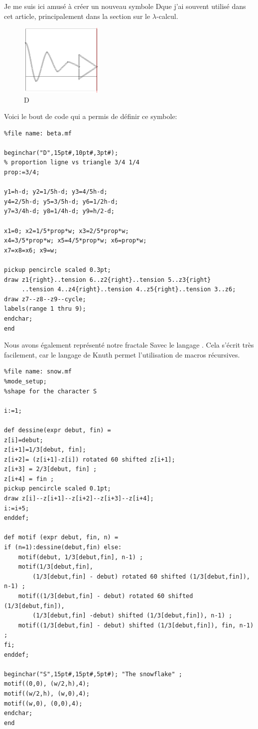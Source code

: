 \documentclass[11pt]{book}
\newcommand{\imp}{{\letterimp D}\hspace{0.1cm}}
\newcommand{\snow}{{\lettersnow S\hspace{0.2cm}}}
\begin{document}
Je me suis ici amusé à créer un nouveau symbole  \imp que j'ai souvent
utilisé dans cet article, principalement dans la section sur le $\lambda$-calcul. 

\begin{figure}[H]
	\centering
	\caption{\imp}
	\includegraphics[width=4.0cm]{imp.png}
\end{figure}
Voici le bout de code qui a permis de définir ce symbole:
\begin{Verbatim}
%file name: beta.mf

beginchar("D",15pt#,10pt#,3pt#);
% proportion ligne vs triangle 3/4 1/4
prop:=3/4;

y1=h-d; y2=1/5h-d; y3=4/5h-d; 
y4=2/5h-d; y5=3/5h-d; y6=1/2h-d;  
y7=3/4h-d; y8=1/4h-d; y9=h/2-d;

x1=0; x2=1/5*prop*w; x3=2/5*prop*w;
x4=3/5*prop*w; x5=4/5*prop*w; x6=prop*w;
x7=x8=x6; x9=w;

pickup pencircle scaled 0.3pt;
draw z1{right}..tension 6..z2{right}..tension 5..z3{right}
     ..tension 4..z4{right}..tension 4..z5{right}..tension 3..z6;
draw z7--z8--z9--cycle; 
labels(range 1 thru 9);
endchar;
end
\end{Verbatim}

Nous avons également représenté notre fractale \snow avec le langage \MF .
Cela s'écrit très facilement, car le langage de Knuth permet l'utilisation
de macros récursives.

\begin{Verbatim}
%file name: snow.mf
%mode_setup;
%shape for the character S

i:=1;

def dessine(expr debut, fin) =
z[i]=debut;
z[i+1]=1/3[debut, fin];
z[i+2]= (z[i+1]-z[i]) rotated 60 shifted z[i+1];
z[i+3] = 2/3[debut, fin] ;
z[i+4] = fin ;  
pickup pencircle scaled 0.1pt;
draw z[i]--z[i+1]--z[i+2]--z[i+3]--z[i+4];
i:=i+5;
enddef;

def motif (expr debut, fin, n) =
if (n=1):dessine(debut,fin) else: 
	motif(debut, 1/3[debut,fin], n-1) ;
	motif(1/3[debut,fin],
		(1/3[debut,fin] - debut) rotated 60 shifted (1/3[debut,fin]), n-1) ;
	motif((1/3[debut,fin] - debut) rotated 60 shifted (1/3[debut,fin]),
		(1/3[debut,fin] -debut) shifted (1/3[debut,fin]), n-1) ;
	motif((1/3[debut,fin] - debut) shifted (1/3[debut,fin]), fin, n-1) ;
fi;
enddef;

beginchar("S",15pt#,15pt#,5pt#); "The snowflake" ;
motif((0,0), (w/2,h),4);
motif((w/2,h), (w,0),4);
motif((w,0), (0,0),4);
endchar;
end
\end{Verbatim}
\end{document}
